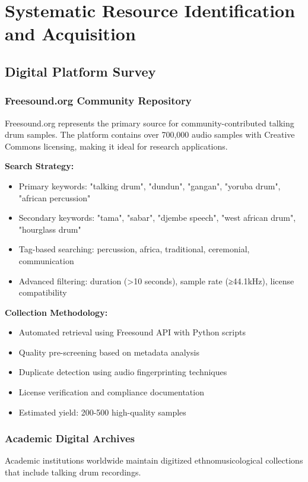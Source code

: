 \documentclass[12pt]{article}
\begin{document}
\section{Systematic Resource Identification and Acquisition}

\subsection{Digital Platform Survey}

\subsubsection{Freesound.org Community Repository}
Freesound.org represents the primary source for community-contributed talking drum samples. The platform contains over 700,000 audio samples with Creative Commons licensing, making it ideal for research applications.

\textbf{Search Strategy:}
\begin{itemize}
    \item Primary keywords: "talking drum", "dundun", "gangan", "yoruba drum", "african percussion"
    \item Secondary keywords: "tama", "sabar", "djembe speech", "west african drum", "hourglass drum"
    \item Tag-based searching: percussion, africa, traditional, ceremonial, communication
    \item Advanced filtering: duration (>10 seconds), sample rate (≥44.1kHz), license compatibility
\end{itemize}

\textbf{Collection Methodology:}
\begin{itemize}
    \item Automated retrieval using Freesound API with Python scripts
    \item Quality pre-screening based on metadata analysis
    \item Duplicate detection using audio fingerprinting techniques
    \item License verification and compliance documentation
    \item Estimated yield: 200-500 high-quality samples
\end{itemize}

\subsubsection{Academic Digital Archives}
Academic institutions worldwide maintain digitized ethnomusicological collections that include talking drum recordings.
\end{document}
